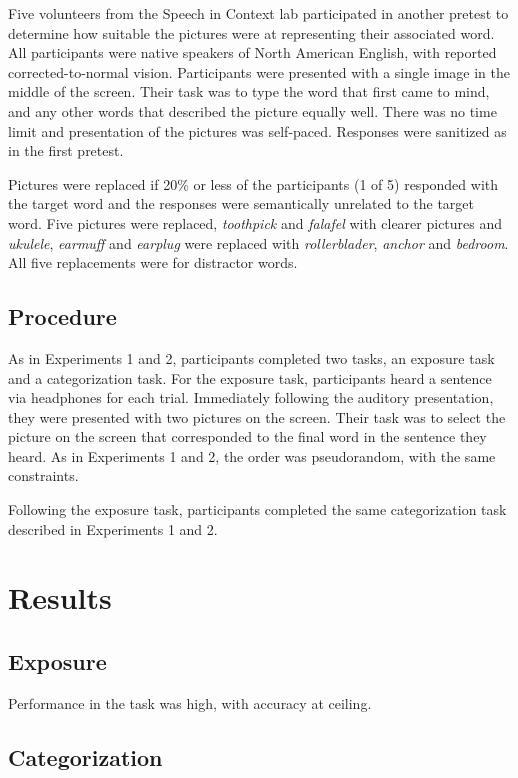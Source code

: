 Five volunteers from the Speech in Context lab participated in another pretest to determine how suitable the pictures were at representing their associated word.  
All participants were native speakers of North American English, with reported corrected-to-normal vision. Participants were presented with a single image in the middle of the screen.  
Their task was to type the word that first came to mind, and any other words that described the picture equally well.  
There was no time limit and presentation of the pictures was self-paced. Responses were sanitized as in the first pretest.  

Pictures were replaced if 20\% or less of the participants (1 of 5) responded with the target word and the responses were semantically unrelated to the target word. 
Five pictures were replaced, \emph{toothpick} and \emph{falafel} with clearer pictures and \emph{ukulele}, \emph{earmuff} and \emph{earplug} were replaced with \emph{rollerblader}, \emph{anchor} and \emph{bedroom}.  
All five replacements were for distractor words.

\subsection{Procedure}

As in Experiments 1 and 2, participants completed two tasks, an exposure task and a categorization task.  For the exposure task, participants heard a sentence via headphones for each trial.  Immediately following the auditory presentation, they were presented with two pictures on the screen.  Their task was to select the picture on the screen that corresponded to the final word in the sentence they heard.  As in Experiments 1 and 2, the order was pseudorandom, with the same constraints.

Following the exposure task, participants completed the same categorization task described in Experiments 1 and 2.

\section{Results}

\subsection{Exposure}

Performance in the task was high, with accuracy at ceiling.

\subsection{Categorization}



